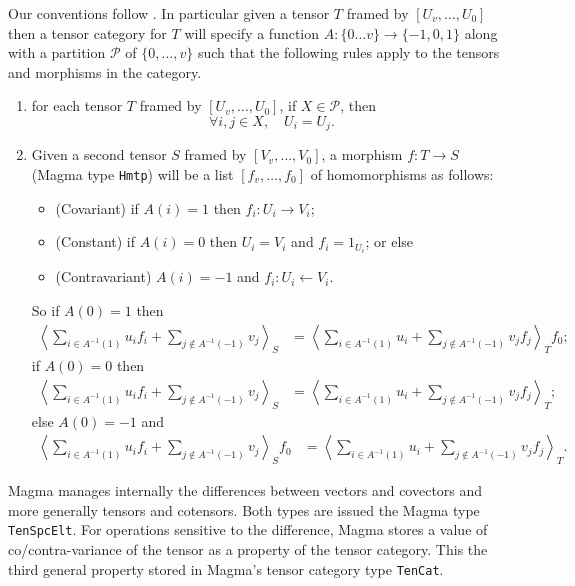 Our conventions follow \cite{Wilson:division}.  In particular given
a tensor $T$ framed by $[U_{v},\dots,U_0]$ then a tensor category for
$T$ will specify a function $A:\{0\dots v\}\to \{-1,0,1\}$ along with
a partition $\mathcal{P}$ of $\{0,\dots,v\}$ such that the following 
rules apply to the tensors and morphisms in the category.
\begin{enumerate}
\item for each tensor $T$ framed by $[U_v,\dots,U_0]$, if
$X\in\mathcal{P}$, then 
$$\forall i,j\in X,\quad U_i=U_j.$$

\item Given a second tensor $S$ framed by $[V_v,\dots,V_0]$,
a morphism $f:T\to S$ (Magma type {\tt Hmtp}) will be a list
$[f_v,\dots,f_0]$ of homomorphisms as follows:
\begin{itemize}
\item (Covariant) if $A(i)=1$ then $f_i:U_i\to V_i$;
\item (Constant) if $A(i)=0$ then $U_i=V_i$ and $f_i=1_{U_i}$; or else
\item (Contravariant) $A(i)=-1$ and $f_i:U_i\leftarrow V_i$.
\end{itemize}
So if $A(0)=1$ then
\begin{align*}
	\left\langle \sum_{i\in A^{-1}(1)} u_i f_i
		+\sum_{j\not\in A^{-1}(-1)} v_j\right\rangle_S
		& = \left\langle  \sum_{i\in A^{-1}(1)} u_i 
		+\sum_{j\not\in A^{-1}(-1)} v_j f_j\right\rangle_T f_0;
\end{align*}
if $A(0)=0$ then
\begin{align*}
	\left\langle \sum_{i\in A^{-1}(1)} u_i f_i
		+\sum_{j\not\in A^{-1}(-1)} v_j\right\rangle_S
		& = \left\langle  \sum_{i\in A^{-1}(1)} u_i 
		+\sum_{j\not\in A^{-1}(-1)} v_j f_j\right\rangle_T;
\end{align*}
else $A(0)=-1$ and 
\begin{align*}
	\left\langle \sum_{i\in A^{-1}(1)} u_i f_i
		+\sum_{j\not\in A^{-1}(-1)} v_j\right\rangle_S f_0
		& = \left\langle  \sum_{i\in A^{-1}(1)} u_i 
		+\sum_{j\not\in A^{-1}(-1)} v_j f_j\right\rangle_T.
\end{align*}
\end{enumerate}

Magma manages internally the differences between 
vectors and covectors and more generally tensors and cotensors.
Both types are issued the Magma type {\tt TenSpcElt}.
For operations sensitive to the difference, Magma stores a value of
co/contra-variance of the tensor as a property of the tensor category.
This the third general property stored in Magma's tensor category type
{\tt TenCat}.

